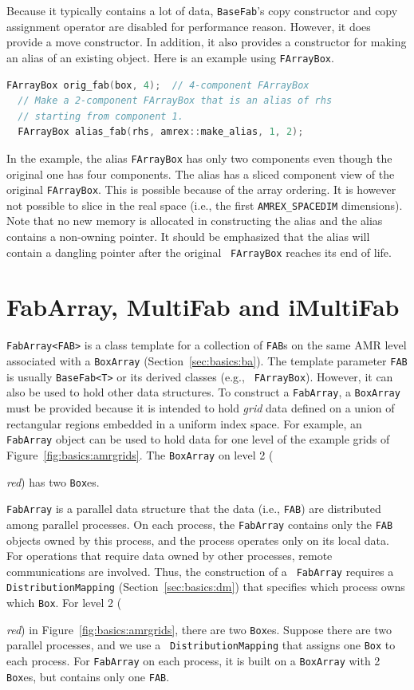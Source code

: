 {Because it typically contains a lot of data, {\tt BaseFab}'s copy
constructor and copy assignment operator are disabled for performance
reason.  However, it does provide a move constructor.  In addition, it
also provides a constructor for making an alias of an existing
object.  Here is an example using {\tt FArrayBox}.
\begin{lstlisting}[language=cpp]
  FArrayBox orig_fab(box, 4);  // 4-component FArrayBox
  // Make a 2-component FArrayBox that is an alias of rhs
  // starting from component 1.
  FArrayBox alias_fab(rhs, amrex::make_alias, 1, 2);
\end{lstlisting}
In the example, the alias {\tt FArrayBox} has only two components even
though the original one has four components.  The alias has a sliced
component view of the original {\tt FArrayBox}.  This is possible
because of the array ordering.  It is however not possible to slice in
the real space (i.e., the first {\tt AMREX\_SPACEDIM} dimensions).
Note that no new memory is allocated in constructing the alias and the
alias contains a non-owning pointer.  It should be emphasized that the
alias will contain a dangling pointer after the original {\tt
  FArrayBox} reaches its end of life.

\section{FabArray, MultiFab and iMultiFab}
\label{sec:basics:multifab}

{\tt FabArray<FAB>} is a class template for a collection of {\tt FAB}s
on the same AMR level associated with a {\tt BoxArray}
(Section~\ref{sec:basics:ba}).  The template parameter {\tt FAB} is
usually {\tt BaseFab<T>} or its derived classes (e.g., {\tt
  FArrayBox}).  However, it can also be used to hold other data
structures.  To construct a {\tt FabArray}, a {\tt BoxArray} must be
provided because it is intended to hold {\emph{grid}} data defined on
a union of rectangular regions embedded in a uniform index space.  For
example, an {\tt FabArray} object can be used to hold data for one
level of the example grids of Figure~\ref{fig:basics:amrgrids}.  The
{\tt BoxArray} on level 2 ({\emph{red}) has two {\tt Box}es.

{\tt FabArray} is a parallel data structure that the data (i.e.,
{\tt FAB}) are distributed among parallel processes.  On each process,
the {\tt FabArray} contains only the {\tt FAB} objects owned by this
process, and the process operates only on its local data.  For
operations that require data owned by other processes, remote
communications are involved.  Thus, the construction of a {\tt
  FabArray} requires a {\tt DistributionMapping}
(Section~\ref{sec:basics:dm}) that specifies which process owns which
{\tt Box}.  For level 2 ({\emph{red}) in
Figure~\ref{fig:basics:amrgrids}, there are two {\tt Box}es.  Suppose
there are two parallel processes, and we use a {\tt
  DistributionMapping} that assigns one {\tt Box} to each process.
For {\tt FabArray} on each process, it is built on a {\tt BoxArray} with
2 {\tt Box}es, but contains only one {\tt FAB}.  

}}}

